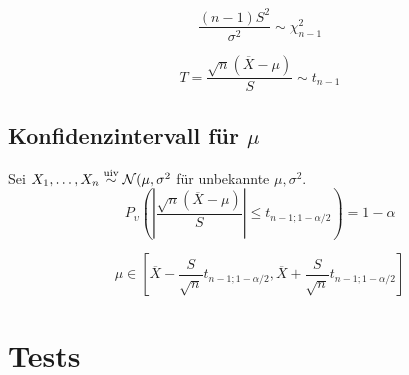 \[ \frac{(n-1)S^2}{\sigma^2} \sim \chi_{n-1}^2 \]

\[ T = \frac{\sqrt{n}(\overline X - \mu)}{S} \sim t_{n-1} \]

\subsection*{Konfidenzintervall für \(\mu\)}

Sei \(X_1,\dots,X_n \stackrel{\text{uiv}}{\sim} \mathcal{N}(\mu,\sigma^2\) für unbekannte \(\mu, \sigma^2\).
\[ P_\upsilon\left(\left|\frac{\sqrt{n}(\overline X - \mu)}{S}\right| \leq t_{n-1;1-\alpha/2}\right) = 1-\alpha \]

\[ \mu \in \left[\overline X - \frac{S}{\sqrt{n}} t_{n-1;1-\alpha/2}, \overline X + \frac{S}{\sqrt{n}} t_{n-1;1-\alpha/2} \right] \]

\section*{Tests}
